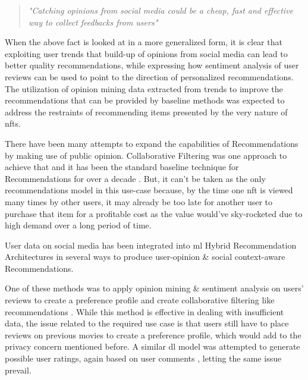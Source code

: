 \documentclass[manuscript,natbib=false, anonymous]{acmart}
\begin{document}
\begin{quote} 
\centering 
\emph{"Catching opinions from social media could be a cheap, fast and effective way to collect feedbacks from users"} 
\\
\raggedleft
\cite{zhangOpinionMiningSentiment2018}
\end{quote}

When the above fact is looked at in a more generalized form, it is clear that exploiting user trends that build-up of opinions from social media can lead to better quality recommendations, while \cite{huReviewerCredibilitySentiment2020} expressing how sentiment analysis of user reviews can be used to point to the direction of personalized recommendations.\\


The utilization of opinion mining data extracted from trends to improve the recommendations that can be provided by baseline methods was expected to address the restraints of recommending items presented by the very nature of \gls{nft}s.


There have been many attempts to expand the capabilities of Recommendations by making use of public opinion. Collaborative Filtering was one approach to achieve that and it has been the standard baseline technique for Recommendations for over a decade \cite{lindenAmazonComRecommendations2003, smithTwoDecadesRecommender2017}. But, it can't be taken as the only recommendations model in this use-case because, by the time one \gls{nft} is viewed many times by other users, it may already be too late for another user to purchase that item for a profitable cost as the value would've sky-rocketed due to high demand over a long period of time.

User data on social media has been integrated into \gls{ml} Hybrid Recommendation Architectures in several ways to produce user-opinion \& social context-aware Recommendations. 

One of these methods was to apply opinion mining \& sentiment analysis on users' reviews to create a preference profile and create collaborative filtering like recommendations \cite{chengHybridRecommenderSystem2020a}. While this method is effective in dealing with insufficient data, the issue related to the required use case is that users still have to place reviews on previous movies to create a preference profile, which would add to the privacy concern mentioned before. A similar \gls{dl} model was attempted to generate possible user ratings, again based on user comments \cite{chenUserRatingClassification2019}, letting the same issue prevail.
\end{document}
